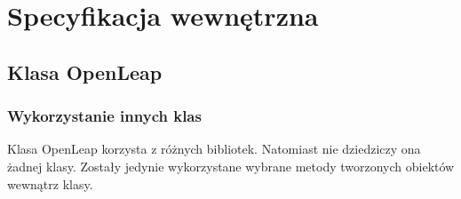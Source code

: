 \chapter{Specyfikacja wewnętrzna}




\section{Klasa OpenLeap}

\subsection{Wykorzystanie innych klas}
\quad Klasa OpenLeap korzysta z różnych bibliotek. Natomiast nie dziedziczy ona żadnej klasy. Zostały jedynie wykorzystane wybrane metody tworzonych obiektów wewnątrz klasy. 


